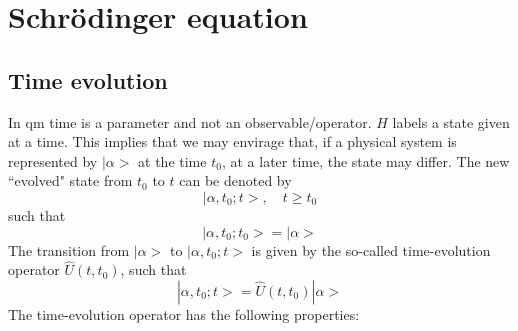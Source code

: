 \section{Schrödinger equation}
\subsection{Time evolution}
In qm time is a parameter and not an observable/operator.
$H$ labels a state given at a time. This implies that we may
envirage that, if a physical system is represented by
$|\alpha>$ at the time $t_0$, at a later time, the state may
differ. The new ``evolved" state from $t_0$ to $t$ can be
denoted by
$$
|\alpha,t_0;t>, \quad t \geq t_0
$$
such that
$$
|\alpha,t_0;t_0> = |\alpha>
$$
The transition from $|\alpha>$ to $|\alpha,t_0;t>$ is given
by the so-called time-evolution operator $\hat{U}(t,t_0)$,
such that
\begin{equation}
  |\alpha,t_0;t> = \hat{U}(t,t_0) |\alpha>
  \label{equ:2.1}
\end{equation}
The time-evolution operator has the following properties:
